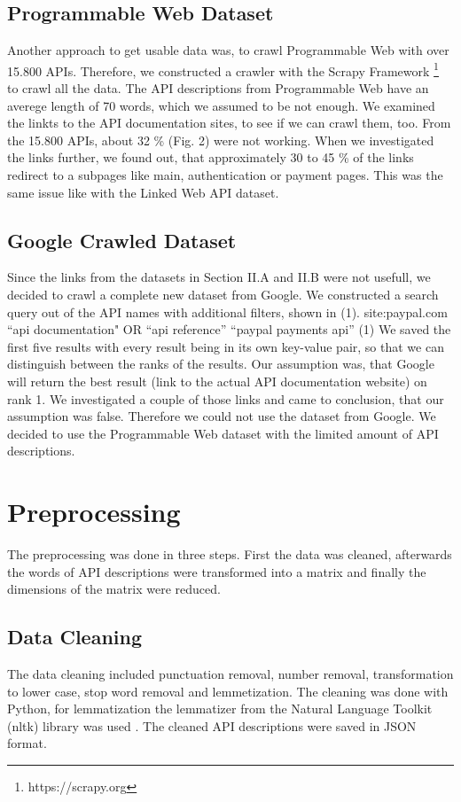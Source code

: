 \documentclass[a4paper]{IEEEtran}
\begin{document}
\subsection{Programmable Web Dataset}
Another approach to get usable data was, to crawl Programmable Web with over 15.800 APIs. Therefore, we constructed a crawler with the Scrapy Framework \footnote[2]{https://scrapy.org} to crawl all the data. The API descriptions from Programmable Web have an averege length of 70 words, which we assumed to be not enough. We examined the linkts to the API documentation sites, to see if we can crawl them, too. From the 15.800 APIs, about 32 \% (Fig. 2) were not working. When we investigated the links further, we found out, that approximately 30 to 45 \% of the links redirect to a subpages like  main, authentication or payment pages. This was the same issue like with the Linked Web API dataset.

\subsection{Google Crawled Dataset}
Since the links from the datasets in Section II.A and II.B were not usefull, we decided to crawl a complete new dataset from Google. We constructed a search query out of the API names with additional filters, shown in (1).
site:paypal.com “api documentation" OR “api reference” “paypal payments api”	(1)
We saved the first five results with every result being in its own key-value pair, so that we can distinguish between the ranks of the results. Our assumption was, that Google will return the best result (link to the actual API documentation website) on rank 1. We investigated a couple of those links and came to conclusion, that our assumption was false. Therefore we could not use the dataset from Google.
We decided to use the Programmable Web dataset with the limited amount of API descriptions.

\section{Preprocessing}
The preprocessing was done in three steps. First the data was cleaned, afterwards the words of API descriptions were transformed into a matrix and finally the dimensions of the matrix were reduced.

\subsection{Data Cleaning}
The data cleaning included punctuation removal, number removal, transformation to lower case, stop word removal and lemmetization. The cleaning was done with Python, for lemmatization the lemmatizer from the Natural Language Toolkit (nltk) library was used \cite{bird2009natural}. The cleaned API descriptions were saved in JSON format.
\end{document}
